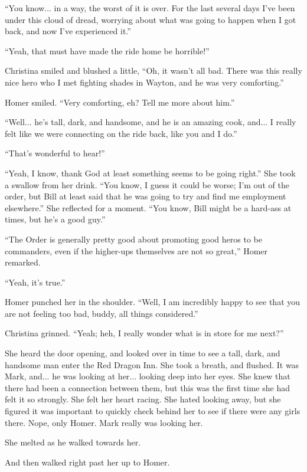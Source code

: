 \documentclass[showtrims,b6paper,draft,10pt]{memoir}
\begin{document}
``You know... in a way, the worst of it is over.  For the last several days I've been under this cloud of dread, worrying about what was going to happen when I got back, and now I've experienced it.''

``Yeah, that must have made the ride home be horrible!''

Christina smiled and blushed a little, ``Oh, it wasn't all bad.  There was this really nice hero who I met fighting shades in Wayton, and he was very comforting.''

Homer smiled.  ``Very comforting, eh?  Tell me more about him.''

``Well... he's tall, dark, and handsome, and he is an amazing cook, and... I really felt like we were connecting on the ride back, like you and I do.''

``That's wonderful to hear!''

``Yeah, I know, thank God at least something seems to be going right.''  She took a swallow from her drink.  ``You know, I guess it could be worse;  I'm out of the order, but Bill at least said that he was going to try and find me employment elsewhere.''  She reflected for a moment.  ``You know, Bill might be a hard-ass at times, but he's a good guy.''

``The Order is generally pretty good about promoting good heros to be commanders, even if the higher-ups themselves are not so great,'' Homer remarked.

``Yeah, it's true.''

Homer punched her in the shoulder.  ``Well, I am incredibly happy to see that you are not feeling too bad, buddy, all things considered.''

Christina grinned.  ``Yeah;  heh, I really wonder what is in store for me next?''

She heard the door opening, and looked over in time to see a tall, dark, and handsome man enter the Red Dragon Inn.  She took a breath, and flushed.  It was Mark, and... he was looking at her... looking deep into her eyes.  She knew that there had been a connection between them, but this was the first time she had felt it so strongly.  She felt her heart racing.  She hated looking away, but she figured it was important to quickly check behind her to see if there were any girls there.  Nope, only Homer.  Mark really was looking her.

She melted as he walked towards her.

And then walked right past her up to Homer.
\end{document}
